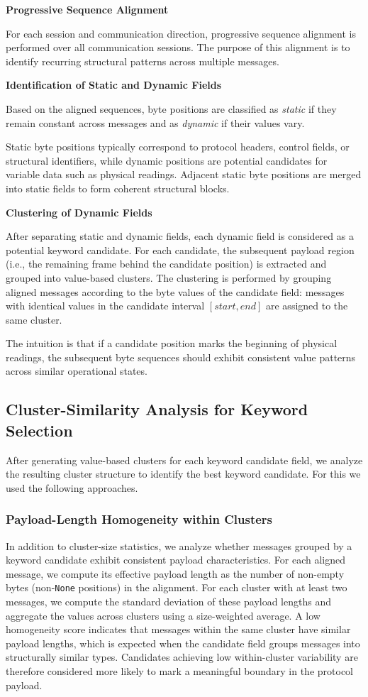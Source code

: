 \textbf{Progressive Sequence Alignment}

For each session and communication direction, progressive sequence
alignment is performed over all communication sessions. The purpose of
this alignment is to identify recurring structural patterns across
multiple messages.

\textbf{Identification of Static and Dynamic Fields}

Based on the aligned sequences, byte positions are classified as
\emph{static} if they remain constant across messages and as
\emph{dynamic} if their values vary.

Static byte positions typically correspond to protocol headers,
control fields, or structural identifiers, while dynamic positions
are potential candidates for variable data such as physical readings.
Adjacent static byte positions are merged into static fields to
form coherent structural blocks.

\textbf{Clustering of Dynamic Fields}

After separating static and dynamic fields, each dynamic field is
considered as a potential keyword candidate. For each candidate,
the subsequent payload region (i.e., the remaining frame behind the
candidate position) is extracted and grouped into value-based clusters.
The clustering is performed by grouping aligned
messages according to the byte values of the candidate field: messages with identical values
in the candidate interval $[start,end]$ are assigned to the same cluster.

The intuition is that if a candidate position marks the beginning
of physical readings, the subsequent byte sequences should exhibit
consistent value patterns across similar operational states.

\subsection{Cluster-Similarity Analysis for Keyword Selection}


After generating value-based clusters for each keyword candidate field, we analyze the
resulting cluster structure to identify the best keyword candidate.
For this we used the following approaches.
 

\subsubsection{Payload-Length Homogeneity within Clusters}
In addition to cluster-size statistics, we analyze whether messages grouped by a keyword
candidate exhibit consistent payload characteristics. For each aligned message, we compute its
effective payload length as the number of non-empty bytes (non-\texttt{None} positions) in the
alignment. For each cluster with at least two messages, we compute the standard deviation of
these payload lengths and aggregate the values across clusters using a size-weighted average.
A low homogeneity score indicates that messages within the same cluster have similar payload
lengths, which is expected when the candidate field groups messages into structurally similar
types. Candidates achieving low within-cluster variability are therefore considered more likely
to mark a meaningful boundary in the protocol payload.
